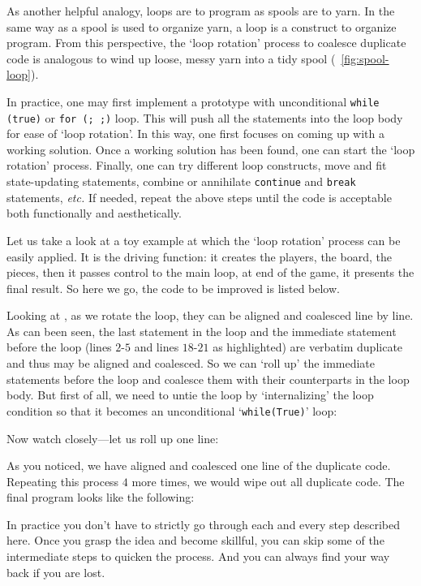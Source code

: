 \documentclass[oneside,11pt]{book}
\theoremstyle{definition}
\theoremstyle{remark}
\newcommand{\code}[1]{\mbox{\lstinline{#1}}}
\begin{document}
As another helpful analogy, loops are to program as spools are to yarn.
In the same way as a spool is used to organize yarn, a loop is a construct to organize program.
From this perspective, the `loop rotation' process to coalesce duplicate code is analogous to
wind up loose, messy yarn into a tidy spool (~\autoref{fig:spool-loop}).


In practice, one may first implement a prototype with unconditional \code{while (true)} or
\code{for (; ;)} loop.
This will push all the statements into the loop body for ease of `loop rotation'.
In this way, one first focuses on coming up with a working solution.
Once a working solution has been found, one can start the `loop rotation' process.
Finally, one can try different loop constructs, move and fit state-updating statements,
combine or annihilate \code{continue} and \code{break} statements, \textit{etc.}
If needed, repeat the above steps until the code is acceptable both functionally and
aesthetically.


Let us take a look at a toy example at which the `loop rotation' process can be easily applied.
It is the driving function: it creates the players, the board, the pieces, then it passes
control to the main loop, at end of the game, it presents the final result.
So here we go, the code to be improved is listed below.
\begin{clisting}[H]
    
\end{clisting}
Looking at , as we rotate the loop, they can be aligned and coalesced line by line.
As can been seen, the last statement in the loop and the immediate statement before the loop
(lines $2$-$5$ and lines $18$-$21$ as highlighted)
are verbatim duplicate and thus may be aligned and coalesced.
So we can `roll up' the immediate statements before the loop and coalesce them with their
counterparts in the loop body.
But first of all, we need to untie the loop by `internalizing' the loop condition
so that it becomes an unconditional `\code{while(True)}' loop:
\begin{clisting}[H]
    
\end{clisting}
Now watch closely---let us roll up one line:
\begin{clisting}[H]
    
\end{clisting}
As you noticed, we have aligned and coalesced one line of the duplicate code.
Repeating this process $4$ more times, we would wipe out all duplicate code.
The final program looks like the following:
\begin{clisting}[H]
    
\end{clisting}
In practice you don't have to strictly go through each and every step described here.
Once you grasp the idea and become skillful, you can skip some of the intermediate steps
to quicken the process.
And you can always find your way back if you are lost.
\end{document}
